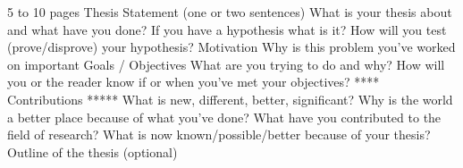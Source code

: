 5 to 10 pages
Thesis Statement (one or two sentences)
What is your thesis about and what have you done?
If you have a hypothesis what is it?
How will you test (prove/disprove) your hypothesis?
Motivation
Why is this problem you've worked on important
Goals / Objectives
What are you trying to do and why?
How will you or the reader know if or when you've met your objectives?
**** Contributions *****
What is new, different, better, significant?
Why is the world a better place because of what you've done?
What have you contributed to the field of research?
What is now known/possible/better because of your thesis?
Outline of the thesis (optional)
